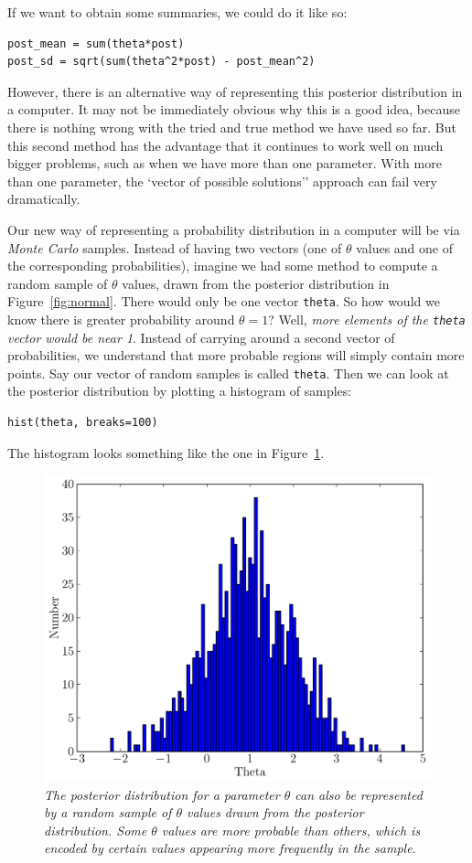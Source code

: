 If we want to obtain some summaries, we could do it like so:
\begin{verbatim}
post_mean = sum(theta*post)
post_sd = sqrt(sum(theta^2*post) - post_mean^2)
\end{verbatim}

However,
there is an alternative way of representing this posterior distribution in a
computer. It may not be immediately obvious why this is a good idea,
because there is nothing wrong with the tried and true method we have used
so far. But this second method has the advantage that it continues to
work well on much bigger problems, such as when we have more than one parameter.
With more than one parameter, the `vector of possible solutions'' approach
can fail very dramatically.

Our new way of representing a probability distribution in a computer will be
via {\it Monte Carlo} samples.
Instead of having two vectors (one of $\theta$ values and one of the
corresponding probabilities),
imagine we had some method to compute a random sample of $\theta$ values, drawn
from the posterior distribution in Figure~\ref{fig:normal}.
There would only be one vector {\tt theta}. So how would we
know there is greater probability around $\theta=1$? Well, {\it more elements
of the {\tt theta} vector would be near 1}.
Instead of carrying around a second vector of
probabilities, we understand that more probable regions will simply contain
more points. Say our vector of random
samples is called {\tt theta}. Then we can look at the posterior distribution
by plotting a histogram of samples:
\begin{verbatim}
hist(theta, breaks=100)
\end{verbatim}
The histogram looks something like the one in Figure~\ref{fig:normal2}.
\begin{figure}[!ht]
\begin{center}
\includegraphics[scale=0.5]{Figures/normal2.pdf}
\caption{\it The posterior distribution for a parameter $\theta$ can also be
represented by a random sample of $\theta$ values drawn from the posterior
distribution. Some $\theta$ values are more probable than others, which is
encoded by certain values appearing more frequently in the sample.
\label{fig:normal2}}
\end{center}
\end{figure}
